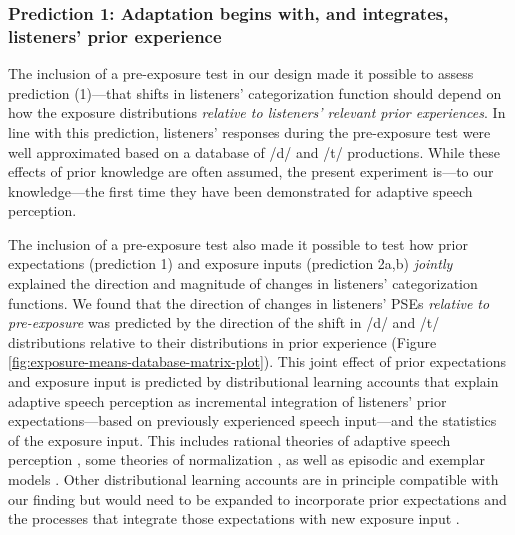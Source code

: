 \documentclass[
  11pt,
  man,mask,floatsintext]{apa6}
\begin{document}
\subsubsection{Prediction 1: Adaptation begins with, and integrates, listeners' prior experience}\label{prediction-1-adaptation-begins-with-and-integrates-listeners-prior-experience}

The inclusion of a pre-exposure test in our design made it possible to assess prediction (1)---that shifts in listeners' categorization function should depend on how the exposure distributions \emph{relative to listeners' relevant prior experiences}. In line with this prediction, listeners' responses during the pre-exposure test were well approximated based on a database of /d/ and /t/ productions. While these effects of prior knowledge are often assumed, the present experiment is---to our knowledge---the first time they have been demonstrated for adaptive speech perception.

The inclusion of a pre-exposure test also made it possible to test how prior expectations (prediction 1) and exposure inputs (prediction 2a,b) \emph{jointly} explained the direction and magnitude of changes in listeners' categorization functions. We found that the direction of changes in listeners' PSEs \emph{relative to pre-exposure} was predicted by the direction of the shift in /d/ and /t/ distributions relative to their distributions in prior experience (Figure \ref{fig:exposure-means-database-matrix-plot}). This joint effect of prior expectations and exposure input is predicted by distributional learning accounts that explain adaptive speech perception as incremental integration of listeners' prior expectations---based on previously experienced speech input---and the statistics of the exposure input. This includes rational theories of adaptive speech perception \autocites[e.g., the ideal adaptor framework,][]{kleinschmidt-jaeger2015,kleinschmidt-jaeger2016}, some theories of normalization \autocite[e.g., the probabilistic sliding template model,][]{nearey-assmann2007}, as well as episodic \autocite{goldinger1998} and exemplar models \autocite{johnson1997}. Other distributional learning accounts are in principle compatible with our finding but would need to be expanded to incorporate prior expectations and the processes that integrate those expectations with new exposure input \autocites[e.g.,][]{bejjanki2011,mcmurray-jongman2011}[see discussion in][]{persson2024,xie2023}.
\end{document}
